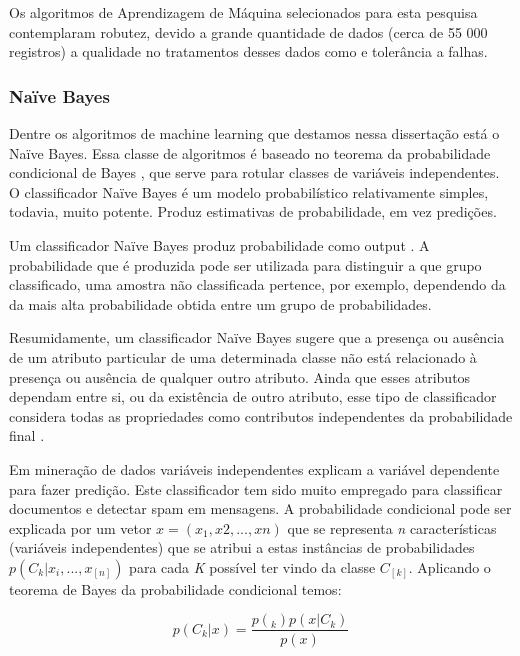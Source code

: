 \vspace{5mm}

Os algoritmos de Aprendizagem de Máquina selecionados para esta pesquisa contemplaram robutez, devido a grande quantidade de dados (cerca de 55 000 registros) a qualidade no tratamentos desses dados como e tolerância a falhas.


%
\subsubsection{Naïve Bayes}
\vspace{5mm}


Dentre os algoritmos de machine learning que destamos nessa dissertação está o Naïve Bayes. 
Essa classe de algoritmos é baseado no teorema da probabilidade condicional de Bayes \cite{montgomery2000estatistica}, que serve 
para rotular classes de variáveis independentes. O classificador Naïve Bayes é um modelo probabilístico relativamente simples, todavia, muito potente. Produz estimativas de probabilidade, em vez predições.


Um classificador Naïve Bayes produz probabilidade como output \cite{policarpo2015semantic}. A probabilidade que é produzida pode ser utilizada para distinguir a que grupo classificado, uma amostra não classificada pertence, por exemplo, dependendo da da mais alta probabilidade obtida entre um grupo de probabilidades.

Resumidamente, um classificador Naïve Bayes sugere que a presença ou ausência de um atributo particular de uma determinada classe não está relacionado à presença ou ausência de qualquer outro atributo. Ainda que esses atributos dependam entre si, ou da existência de outro atributo, esse tipo de classificador considera todas as propriedades como contributos independentes da probabilidade final \cite{policarpo2015semantic}.

Em mineração de dados variáveis independentes explicam a variável dependente para fazer predição.
Este classificador tem sido muito empregado para classificar documentos e detectar spam em mensagens. 
A probabilidade condicional pode ser explicada por um vetor $x = (x_{1}, x{2}, ..., x{n})$ que se representa \textit{n} características (variáveis independentes) que se atribui a estas instâncias de probabilidades $p(C_{k}|x_{i},...,x_[n])$ para cada \textit{K} possível ter vindo da classe $C_[k]$. Aplicando o teorema de Bayes da probabilidade condicional temos:

\begin{equation}
p(C_{k}|x) = \frac{p(_{k})p(x|C_{k})}{p(x)}
\end{equation}

